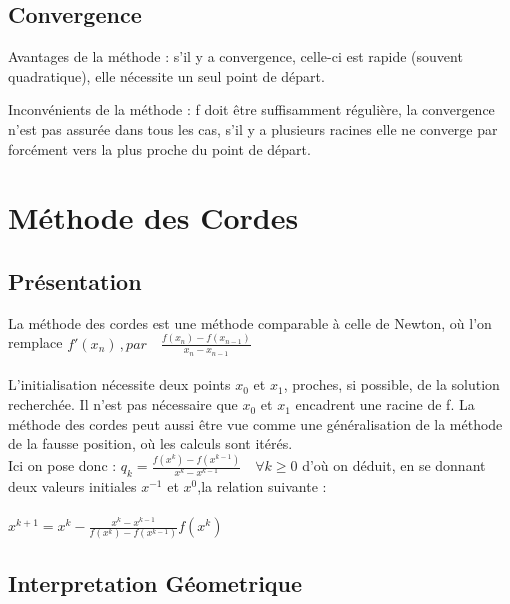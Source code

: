 \documentclass{article}
\begin{document}
\subsection{Convergence}

Avantages de la méthode : s’il y a convergence, celle-ci est rapide (souvent quadratique), elle nécessite un
seul point de départ.

Inconvénients de la méthode : f doit être suffisamment régulière, la convergence n’est pas assurée dans tous
les cas, s’il y a plusieurs racines elle ne converge par forcément vers la plus proche du point de départ.





\newpage
\section{Méthode des Cordes}
\subsection{Présentation} 
La méthode des cordes est une méthode comparable à celle de Newton, où l'on remplace ${\displaystyle f'(x_{n})\,}, par \quad  {\displaystyle {\frac {f(x_{n})-f(x_{n-1})}{x_{n}-x_{n-1}}}}$ \\ \\
L'initialisation nécessite deux points $x_0$ et $x_1$, proches, si possible, de la solution recherchée. Il n'est pas nécessaire que $x_0$ et $x_1$ encadrent une racine de f. La méthode des cordes peut aussi être vue comme une généralisation de la méthode de la fausse position, où les calculs sont itérés. \\
 Ici on pose donc : $q_k = \frac{f(x^k) - f(x^{k-1})}{x^k - x^{k-1}} \quad \forall k \geq 0 $
 d’où on déduit, en se donnant deux valeurs initiales $x^{−1}$ et $x^0$,la relation suivante : \\ \\
    $x^{k+1} = x^k - \frac{x^k - x^{k-1}}{ f(x^k)- f(x^{k-1}) }f(x^k)$

\subsection{Interpretation Géometrique}
\end{document}
